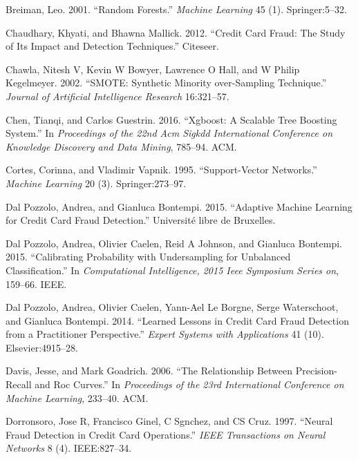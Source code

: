 \documentclass[12pt,]{article}
\begin{document}
\leavevmode\hypertarget{ref-breiman2001random}{}%
Breiman, Leo. 2001. ``Random Forests.'' \emph{Machine Learning} 45 (1).
Springer:5--32.

\leavevmode\hypertarget{ref-chaudhary2012credit}{}%
Chaudhary, Khyati, and Bhawna Mallick. 2012. ``Credit Card Fraud: The
Study of Its Impact and Detection Techniques.'' Citeseer.

\leavevmode\hypertarget{ref-chawla2002smote}{}%
Chawla, Nitesh V, Kevin W Bowyer, Lawrence O Hall, and W Philip
Kegelmeyer. 2002. ``SMOTE: Synthetic Minority over-Sampling Technique.''
\emph{Journal of Artificial Intelligence Research} 16:321--57.

\leavevmode\hypertarget{ref-chen2016xgboost}{}%
Chen, Tianqi, and Carlos Guestrin. 2016. ``Xgboost: A Scalable Tree
Boosting System.'' In \emph{Proceedings of the 22nd Acm Sigkdd
International Conference on Knowledge Discovery and Data Mining},
785--94. ACM.

\leavevmode\hypertarget{ref-cortes1995support}{}%
Cortes, Corinna, and Vladimir Vapnik. 1995. ``Support-Vector Networks.''
\emph{Machine Learning} 20 (3). Springer:273--97.

\leavevmode\hypertarget{ref-dal2015adaptive}{}%
Dal Pozzolo, Andrea, and Gianluca Bontempi. 2015. ``Adaptive Machine
Learning for Credit Card Fraud Detection.'' Université libre de
Bruxelles.

\leavevmode\hypertarget{ref-dal2015calibrating}{}%
Dal Pozzolo, Andrea, Olivier Caelen, Reid A Johnson, and Gianluca
Bontempi. 2015. ``Calibrating Probability with Undersampling for
Unbalanced Classification.'' In \emph{Computational Intelligence, 2015
Ieee Symposium Series on}, 159--66. IEEE.

\leavevmode\hypertarget{ref-dal2014learned}{}%
Dal Pozzolo, Andrea, Olivier Caelen, Yann-Ael Le Borgne, Serge
Waterschoot, and Gianluca Bontempi. 2014. ``Learned Lessons in Credit
Card Fraud Detection from a Practitioner Perspective.'' \emph{Expert
Systems with Applications} 41 (10). Elsevier:4915--28.

\leavevmode\hypertarget{ref-davis2006relationship}{}%
Davis, Jesse, and Mark Goadrich. 2006. ``The Relationship Between
Precision-Recall and Roc Curves.'' In \emph{Proceedings of the 23rd
International Conference on Machine Learning}, 233--40. ACM.

\leavevmode\hypertarget{ref-dorronsoro1997neural}{}%
Dorronsoro, Jose R, Francisco Ginel, C Sgnchez, and CS Cruz. 1997.
``Neural Fraud Detection in Credit Card Operations.'' \emph{IEEE
Transactions on Neural Networks} 8 (4). IEEE:827--34.
\end{document}
